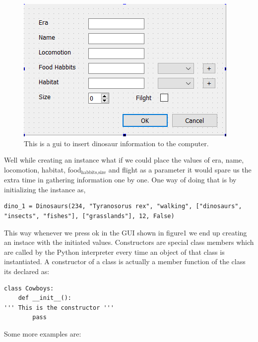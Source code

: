 \documentclass[11pt]{article}
\begin{document}
\begin{figure}[htbp]
\centering
\includegraphics[width=.9\linewidth]{./img/dino_gui.png}
\caption{\label{fig:orgd726d04}
This is a gui to insert dinosaur information to the computer.}
\end{figure}

Well while creating an instance what if we could place the values of era, name, locomotion, habitat, food\(_{\text{habbits,size}}\) and flight as a parameter it would spare us the extra time in gathering information one by one. One way of doing that is by initializing the instance as,

\begin{verbatim}
dino_1 = Dinosaurs(234, "Tyranosorus rex", "walking", ["dinosaurs", "insects", "fishes"], ["grasslands"], 12, False)
\end{verbatim}

This way whenever we press ok in the GUI shown in figure1 we end up creating an instace with the initiated values. Constructors are special class members which are called by the Python interpreter every time an object of that class is instantiated. A constructor of a class is actually a member function of the class its declared as:
\begin{verbatim}
class Cowboys:
    def __init__():
''' This is the constructor '''
        pass
\end{verbatim}

Some more examples are:
\end{document}
